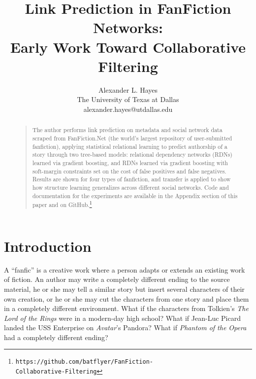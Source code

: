 \documentclass[letterpaper]{article}
\begin{document}
%

\title{Link Prediction in FanFiction Networks:\\Early Work Toward Collaborative Filtering}
\author{Alexander L. Hayes\\
The University of Texas at Dallas\\
alexander.hayes@utdallas.edu\\
}

\maketitle
\begin{abstract}
\begin{quote}
The author performs link prediction on metadata and social network data scraped from FanFiction.Net (the world's largest repository of user-submitted fanfiction), applying statistical relational learning to predict authorship of a story through two tree-based models: relational dependency networks (RDNs) learned via gradient boosting, and RDNs learned via gradient boosting with soft-margin constraints set on the cost of false positives and false negatives. Results are shown for four types of fanfiction, and transfer is applied to show how structure learning generalizes across different social networks. Code and documentation for the experiments are available in the Appendix section of this paper and on GitHub.\footnote{\texttt{https://github.com/batflyer/FanFiction-\\Collaborative-Filtering}}
\end{quote}
\end{abstract}

\section{Introduction}
A ``fanfic'' is a creative work where a person adapts or extends an existing work of fiction.  An author may write a completely different ending to the source material, he or she may tell a similar story but insert several characters of their own creation, or he or she may cut the characters from one story and place them in a completely different environment.  What if the characters from Tolkien's \textit{The Lord of the Rings} were in a modern-day high school?  What if Jean-Luc Picard landed the USS Enterprise on \textit{Avatar}'s Pandora?  What if \textit{Phantom of the Opera} had a completely different ending?
\end{document}
